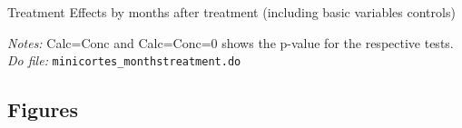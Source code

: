 \documentclass[11pt]{article}
\begin{document}
\begin{table}[H]
    \caption{Treatment Effects by months after treatment (including basic variables controls)}
    \label{Table_effects}
    \begin{center}
    \scriptsize{}
    \end{center}
    \footnotesize
    \textit{Notes:} 
    Calc=Conc and Calc=Conc=0 shows the p-value for the respective tests.
    \textit{Do file: } \texttt{minicortes\_monthstreatment.do}
\end{table}








\subsection{Figures}
\end{document}
